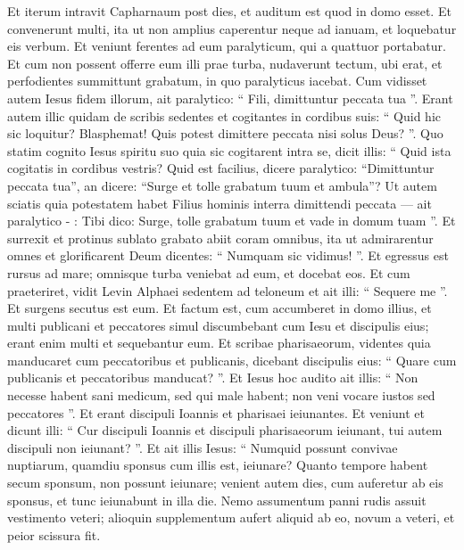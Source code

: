 \begin{biblechapter}
\begin{biblechapter}
\verse Et iterum intravit Capharnaum post dies, et auditum est quod in domo esset. 
\verse Et convenerunt multi, ita ut non amplius caperentur neque ad ianuam, et loquebatur eis verbum. 
\verse Et veniunt ferentes ad eum paralyticum, qui a quattuor portabatur. 
\verse Et cum non possent offerre eum illi prae turba, nudaverunt tectum, ubi erat, et perfodientes summittunt grabatum, in quo paralyticus iacebat. 
\verse Cum vidisset autem Iesus fidem illorum, ait paralytico: “ Fili, dimittuntur peccata tua ”.
 \verse Erant autem illic quidam de scribis sedentes et cogitantes in cordibus suis: 
 \verse “ Quid hic sic loquitur? Blasphemat! Quis potest dimittere peccata nisi solus Deus? ”. 
\verse Quo statim cognito Iesus spiritu suo quia sic cogitarent intra se, dicit illis: “ Quid ista cogitatis in cordibus vestris? 
\verse Quid est facilius, dicere paralytico: “Dimittuntur peccata tua”, an dicere: “Surge et tolle grabatum tuum et ambula”? 
\verse Ut autem sciatis quia potestatem habet Filius hominis interra dimittendi peccata — ait paralytico - : 
\verse Tibi dico: Surge, tolle grabatum tuum et vade in domum tuam ”. 
\verse Et surrexit et protinus sublato grabato abiit coram omnibus, ita ut admirarentur omnes et glorificarent Deum dicentes: “ Numquam sic vidimus! ”.
 \verse Et egressus est rursus ad mare; omnisque turba veniebat ad eum, et docebat eos. 
\verse Et cum praeteriret, vidit Levin Alphaei sedentem ad teloneum et ait illi: “ Sequere me ”. Et surgens secutus est eum. 
\verse Et factum est, cum accumberet in domo illius, et multi publicani et peccatores simul discumbebant cum Iesu et discipulis eius; erant enim multi et sequebantur eum. 
\verse Et scribae pharisaeorum, videntes quia manducaret cum peccatoribus et publicanis, dicebant discipulis eius: “ Quare cum publicanis et peccatoribus manducat? ”. 
 \verse Et Iesus hoc audito ait illis: “ Non necesse habent sani medicum, sed qui male habent; non veni vocare iustos sed peccatores ”.
 \verse Et erant discipuli Ioannis et pharisaei ieiunantes. Et veniunt et dicunt illi: “ Cur discipuli Ioannis et discipuli pharisaeorum ieiunant, tui autem discipuli non ieiunant? ”. 
\verse Et ait illis Iesus: “ Numquid possunt convivae nuptiarum, quamdiu sponsus cum illis est, ieiunare? Quanto tempore habent secum sponsum, non possunt ieiunare; 
\verse venient autem dies, cum auferetur ab eis sponsus, et tunc ieiunabunt in illa die. 
\verse Nemo assumentum panni rudis assuit vestimento veteri; alioquin supplementum aufert aliquid ab eo, novum a veteri, et peior scissura fit. 

\end{biblechapter}
\end{biblechapter}
